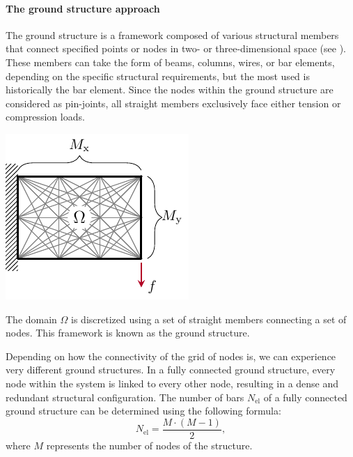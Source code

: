 \paragraph{The ground structure approach}
The ground structure is a framework composed of various structural members that connect specified points or nodes in two- or three-dimensional space (see ). These members can take the form of beams, columns, wires, or bar elements, depending on the specific structural requirements, but the most used is historically the bar element. Since the nodes within the ground structure are considered as pin-joints, all straight members exclusively face either tension or compression loads. 
\begin{marginfigure}
    \centering
    \includegraphics{figures/02_literature/04_disc_mesh/d_mesh.pdf}
    \caption{The domain $\Omega$ is discretized using a set of straight members connecting a set of nodes. This framework is known as the ground structure.}
    \label{fig:02_mesh_d}
\end{marginfigure}

Depending on how the connectivity of the grid of nodes is, we can experience very different ground structures. In a fully connected ground structure, every node within the system is linked to every other node, resulting in a dense and redundant structural configuration. The number of bars $N_{\text{el}}$ of a fully connected ground structure can be determined using the following formula:
\begin{equation}
    N_{\text{el}} = \frac{M \cdot (M-1)}{2},
\end{equation}
where $M$ represents the number of nodes of the structure.

